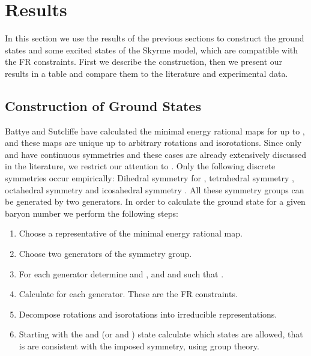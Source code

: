 \documentclass[a4paper,12pt]{article}
\begin{document}
\section{Results}
\label{Results}

In this section we use the results of the previous sections to construct the 
ground states and some excited states of the Skyrme model, which are 
compatible with the FR constraints. First we describe the construction, 
then we present our results in a table and compare them to the literature 
and experimental data. 


\subsection{Construction of Ground States}
\label{Construction}

Battye and Sutcliffe have calculated the minimal energy rational 
maps for \coordHE{} up to \coordHE{}, and 
these maps are unique up to arbitrary rotations and isorotations. Since 
only \coordHE{} and \coordHE{} have continuous symmetries and these cases are already 
extensively discussed in the literature, we restrict our attention to \coordHE{}. 
Only the following discrete symmetries occur empirically: 
Dihedral symmetry \coordHE{} for \coordHE{}, tetrahedral symmetry \coordHE{}, 
octahedral symmetry \coordHE{} and  icosahedral symmetry \coordHE{}. All these symmetry 
groups can be generated by two generators. In order to calculate the 
ground state for a given baryon number \coordHE{} we perform the following steps: 

\begin{enumerate}
\item Choose a representative \coordHE{} of the minimal energy rational map.
\item Choose two generators of the symmetry group.
\item For each generator determine \coordHE{} and \myHighlight{$\alpha$}\coordHE{}, and \coordHE{} 
and \myHighlight{$\beta$}\coordHE{} such that \coordHE{}.
\item Calculate \coordHE{}  \coordHE{} for each generator. These are the FR 
constraints.
\item Decompose rotations and isorotations into irreducible representations.
\item Starting with the \coordHE{} and \coordHE{} (or \coordHE{} and 
\coordHE{}) state calculate which states are allowed, that 
is are consistent with the imposed symmetry, using group theory.
\end{enumerate}
\end{document}
